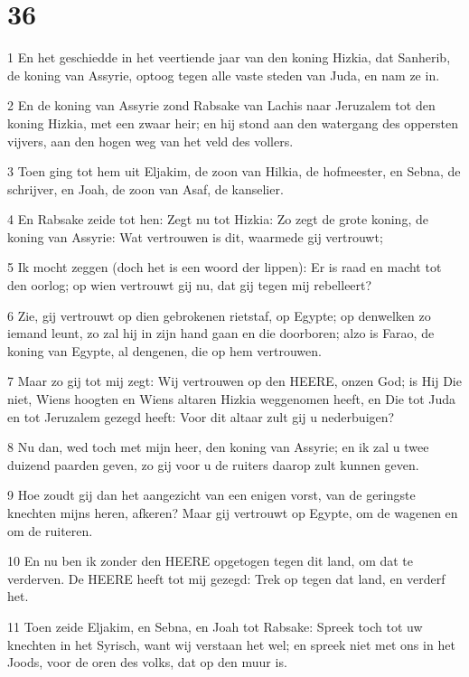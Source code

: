 \chapter{36}

\par 1 En het geschiedde in het veertiende jaar van den koning Hizkia, dat Sanherib, de koning van Assyrie, optoog tegen alle vaste steden van Juda, en nam ze in.
\par 2 En de koning van Assyrie zond Rabsake van Lachis naar Jeruzalem tot den koning Hizkia, met een zwaar heir; en hij stond aan den watergang des oppersten vijvers, aan den hogen weg van het veld des vollers.
\par 3 Toen ging tot hem uit Eljakim, de zoon van Hilkia, de hofmeester, en Sebna, de schrijver, en Joah, de zoon van Asaf, de kanselier.
\par 4 En Rabsake zeide tot hen: Zegt nu tot Hizkia: Zo zegt de grote koning, de koning van Assyrie: Wat vertrouwen is dit, waarmede gij vertrouwt;
\par 5 Ik mocht zeggen (doch het is een woord der lippen): Er is raad en macht tot den oorlog; op wien vertrouwt gij nu, dat gij tegen mij rebelleert?
\par 6 Zie, gij vertrouwt op dien gebrokenen rietstaf, op Egypte; op denwelken zo iemand leunt, zo zal hij in zijn hand gaan en die doorboren; alzo is Farao, de koning van Egypte, al dengenen, die op hem vertrouwen.
\par 7 Maar zo gij tot mij zegt: Wij vertrouwen op den HEERE, onzen God; is Hij Die niet, Wiens hoogten en Wiens altaren Hizkia weggenomen heeft, en Die tot Juda en tot Jeruzalem gezegd heeft: Voor dit altaar zult gij u nederbuigen?
\par 8 Nu dan, wed toch met mijn heer, den koning van Assyrie; en ik zal u twee duizend paarden geven, zo gij voor u de ruiters daarop zult kunnen geven.
\par 9 Hoe zoudt gij dan het aangezicht van een enigen vorst, van de geringste knechten mijns heren, afkeren? Maar gij vertrouwt op Egypte, om de wagenen en om de ruiteren.
\par 10 En nu ben ik zonder den HEERE opgetogen tegen dit land, om dat te verderven. De HEERE heeft tot mij gezegd: Trek op tegen dat land, en verderf het.
\par 11 Toen zeide Eljakim, en Sebna, en Joah tot Rabsake: Spreek toch tot uw knechten in het Syrisch, want wij verstaan het wel; en spreek niet met ons in het Joods, voor de oren des volks, dat op den muur is.
